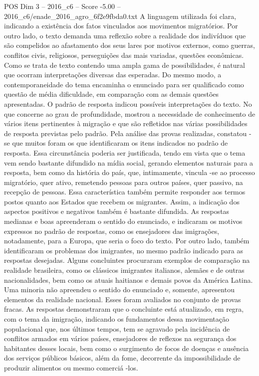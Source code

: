 \begin{textsample}{POS Dim 3 – 2016\_c6 – Score -5.00 – 2016\_c6/enade\_2016\_agro\_6f2e9fbda0.txt}
A linguagem utilizada foi clara, indicando a existência dos fatos vinculados aos movimentos migratórios.
Por outro lado, o texto demanda uma reflexão sobre a realidade dos indivíduos que são compelidos ao afastamento dos seus lares por motivos externos, como guerras, conflitos civis, religiosos, perseguições das mais variadas, questões econômicas.
Como se trata de texto contendo uma ampla gama de possibilidades, é natural que ocorram interpretações diversas das esperadas.
Do mesmo modo, a contemporaneidade do tema encaminha o enunciado para ser qualificado como questão de média dificuldade, em comparação com as demais questões apresentadas.
O padrão de resposta indicou possíveis interpretações do texto.
No que concerne ao grau de profundidade, mostrou a necessidade de conhecimento de vários itens pertinentes à migração e que são refletidos nas várias possibilidades de resposta previstas pelo padrão.
Pela análise das provas realizadas, constatou -se que muitos foram os que identificaram os itens indicados no padrão de resposta.
Essa circunstância poderia ser justificada, tendo em vista que o tema vem sendo bastante difundido na mídia social, gerando elementos naturais para a resposta, bem como da história do país, que, intimamente, vincula -se ao processo migratório, quer ativo, remetendo pessoas para outros países, quer passivo, na recepção de pessoas.
Essa característica também permite responder aos termos postos quanto aos Estados que recebem os migrantes.
Assim, a indicação dos aspectos positivos e negativos também é bastante difundida.
As respostas medianas e boas apreenderam o sentido do enunciado, e indicaram os motivos expressos no padrão de respostas, como os ensejadores das imigrações, notadamente, para a Europa, que seria o foco do texto.
Por outro lado, também identificaram os problemas dos imigrantes, no mesmo padrão indicado para as respostas desejadas.
Alguns concluintes procuraram exemplos de comparação na realidade brasileira, como os clássicos imigrantes italianos, alemães e de outras nacionalidades, bem como os atuais haitianos e demais povos da América Latina.
Uma minoria não apreendeu o sentido do enunciado e, somente, apresentou elementos da realidade nacional.
Esses foram avaliados no conjunto de provas fracas.
As respostas demonstraram que o concluinte está atualizado, em regra, com o tema da imigração, indicando os fundamentos dessa movimentação populacional que, nos últimos tempos, tem se agravado pela incidência de conflitos armados em vários países, ensejadores de reflexos na segurança dos habitantes desses locais, bem como o surgimento de focos de doenças e ausência dos serviços públicos básicos, além da fome, decorrente da impossibilidade de produzir alimentos ou mesmo comerciá -los.

\end{textsample}
